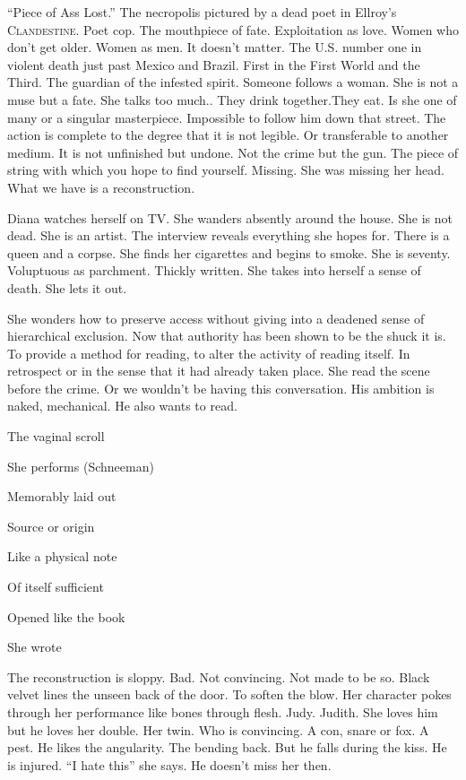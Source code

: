 \documentclass[
]{memoir}
\begin{document}
``Piece of Ass Lost.'' The necropolis pictured by a dead poet in
Ellroy's \textsc{Clandestine}. Poet cop. The mouthpiece of fate.
Exploitation as love. Women who don't get older. Women as men. It
doesn't matter. The U.S. number one in violent death just past Mexico
and Brazil. First in the First World and the Third. The guardian of the
infested spirit. Someone follows a woman. She is not a muse but a fate.
She talks too much.. They drink together.They eat. Is she one of many or
a singular masterpiece. Impossible to follow him down that street. The
action is complete to the degree that it is not legible. Or transferable
to another medium. It is not unfinished but undone. Not the crime but
the gun. The piece of string with which you hope to find yourself.
Missing. She was missing her head. What we have is a reconstruction.

Diana watches herself on TV. She wanders absently around the house. She
is not dead. She is an artist. The interview reveals everything she
hopes for. There is a queen and a corpse. She finds her cigarettes and
begins to smoke. She is seventy. Voluptuous as parchment. Thickly
written. She takes into herself a sense of death. She lets it out.

She wonders how to preserve access without giving into a deadened sense
of hierarchical exclusion. Now that authority has been shown to be the
shuck it is. To provide a method for reading, to alter the activity of
reading itself. In retrospect or in the sense that it had already taken
place. She read the scene before the crime. Or we wouldn't be having
this conversation. His ambition is naked, mechanical. He also wants to
read.

The vaginal scroll

She performs (Schneeman)

Memorably laid out

Source or origin

Like a physical note

Of itself sufficient

Opened like the book

She wrote

The reconstruction is sloppy. Bad. Not convincing. Not made to be so.
Black velvet lines the unseen back of the door. To soften the blow. Her
character pokes through her performance like bones through flesh. Judy.
Judith. She loves him but he loves her double. Her twin. Who is
convincing. A con, snare or fox. A pest. He likes the angularity. The
bending back. But he falls during the kiss. He is injured. ``I hate
this'' she says. He doesn't miss her then.
\end{document}
